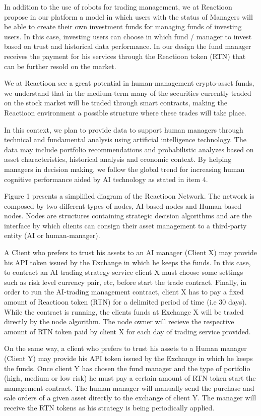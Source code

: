 \documentclass[
	article,			%
	12pt,				%
	oneside,			%
	a4paper,			%
	brazil,				%
	english,
	sumario=tradicional
	]{abntex2}
\begin{document}
In addition to the use of robots for trading management, we at Reactioon propose in our platform a model in which users with the status of Managers will be able to create their own investment funds for managing funds of investing users. In this case, investing users can choose in which fund / manager to invest based on trust and  historical data performance. In our design the fund manager receives the payment for his services through the Reactioon token (RTN) that can be further resold on the market.

We at Reactioon see a great potential in human-management crypto-asset funds, we understand that in the medium-term many of the securities currently traded on the stock market will be traded through smart contracts,  making the Reactioon environment a possible structure where these trades will take place. 

In this context, we plan to provide data to support human managers through technical and fundamental analysis using artificial intelligence technology. The data may include portfolio recommendations and probabilistic analyzes based on asset characteristics, historical analysis and economic context. By helping managers in decision making, we follow the global trend for increasing human cognitive performance aided by AI technology as stated in item 4.

Figure 1 presents a simplified diagram of the Reactioon Network. The network is composed by two different types of nodes, AI-based nodes and Human-based nodes. Nodes are structures containing strategic decision algorithms and are the interface by which clients can consign their asset management to a third-party entity (AI or human-manager). 

A Client who prefers to trust his assets to an AI manager (Client X) may provide his API token issued by the Exchange in which he keeps the funds. In this case, to contract an AI trading strategy service client X must choose some settings such as risk level currency pair, etc, before start the trade contract. Finally, in order to run the AI-trading management contract, client X has to pay a fixed amount of Reactioon token (RTN) for a delimited period of time (i.e 30 days). While the contract is running, the clients funds at Exchange X will be traded directly by the node algorithm. The node owner will recieve the respective amount of RTN token paid by client X for each day of trading service provided.

On the same way, a client who prefers to trust his assets to a Human manager (Client Y) may provide his API token issued by the Exchange in which he keeps the funds. Once client Y has chosen the fund manager and the type of portfolio (high, medium or low risk) he must pay a certain amount of RTN token start the management contract. The human manager will manually send the purchase and sale orders of a given asset directly to the exchange of client Y. The manager will receive the RTN tokens as his strategy is being periodically applied.
\end{document}
